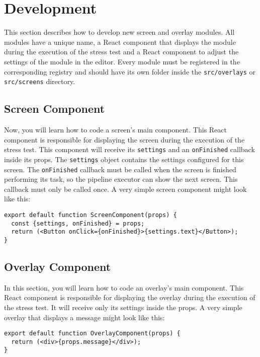 \section{Development}
\label{sec:development}

This section describes how to develop new screen and overlay modules.
All modules have a unique name, a React component that displays the module during the execution of the stress test and a React component to adjust the settings of the module in the editor. 
Every module must be registered in the corresponding registry and should have its own folder inside the \texttt{src/overlays} or \texttt{src/screens} directory.

\subsection{Screen Component}
\label{sec:development-screens}

Now, you will learn how to code a screen's main component. 
This React component is responsible for displaying the screen during the execution of the stress test.
This component will receive its \texttt{settings} and an \texttt{onFinished} callback inside its props. 
The \texttt{settings} object contains the settings configured for this screen. 
The \texttt{onFinished} callback must be called when the screen is finished performing its task, so the pipeline executor can show the next screen. 
This callback must only be called once. 
A very simple screen component might look like this:

\begin{verbatim}
export default function ScreenComponent(props) {
  const {settings, onFinished} = props;
  return (<Button onClick={onFinished}>{settings.text}</Button>);
}
\end{verbatim}

\subsection{Overlay Component}
\label{sec:development-overlays}
In this section, you will learn how to code an overlay's main component. 
This React component is responsible for displaying the overlay during the execution of the stress test. 
It will receive only its settings inside the props. 
A very simple overlay that displays a message might look like this:
\begin{verbatim}
export default function OverlayComponent(props) {
  return (<div>{props.message}</div>);
}
\end{verbatim}

